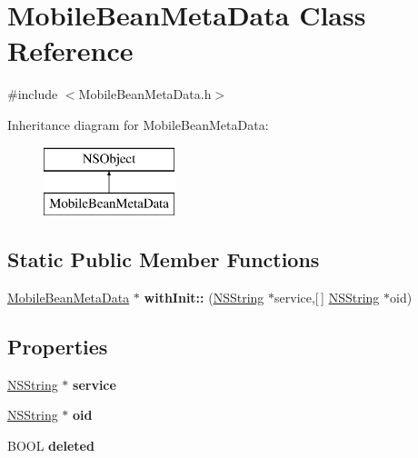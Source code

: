 \hypertarget{interface_mobile_bean_meta_data}{
\section{\-Mobile\-Bean\-Meta\-Data \-Class \-Reference}
\label{interface_mobile_bean_meta_data}
}


{\ttfamily \#include $<$\-Mobile\-Bean\-Meta\-Data.\-h$>$}

\-Inheritance diagram for \-Mobile\-Bean\-Meta\-Data\-:\begin{figure}[H]
\begin{center}
\leavevmode
\includegraphics[height=2.000000cm]{interface_mobile_bean_meta_data}
\end{center}
\end{figure}
\subsection*{\-Static \-Public \-Member \-Functions}
\begin{DoxyCompactItemize}
\item 
\hypertarget{interface_mobile_bean_meta_data_a3a62abb5f161e11bc11c7c7c0a5852d7}{
\hyperlink{interface_mobile_bean_meta_data}{\-Mobile\-Bean\-Meta\-Data} $\ast$ {\bfseries with\-Init\-::} (\hyperlink{class_n_s_string}{\-N\-S\-String} $\ast$service,\mbox{[}$\,$\mbox{]} \hyperlink{class_n_s_string}{\-N\-S\-String} $\ast$oid)}
\label{interface_mobile_bean_meta_data_a3a62abb5f161e11bc11c7c7c0a5852d7}

\end{DoxyCompactItemize}
\subsection*{\-Properties}
\begin{DoxyCompactItemize}
\item 
\hypertarget{interface_mobile_bean_meta_data_a92020136f5c9b890d273a4bffc79041f}{
\hyperlink{class_n_s_string}{\-N\-S\-String} $\ast$ {\bfseries service}}
\label{interface_mobile_bean_meta_data_a92020136f5c9b890d273a4bffc79041f}

\item 
\hypertarget{interface_mobile_bean_meta_data_aaf38f1170c640abeea172c9d97296bec}{
\hyperlink{class_n_s_string}{\-N\-S\-String} $\ast$ {\bfseries oid}}
\label{interface_mobile_bean_meta_data_aaf38f1170c640abeea172c9d97296bec}

\item 
\hypertarget{interface_mobile_bean_meta_data_ab691f741ac2f8586e8cee395fa14ec9b}{
\-B\-O\-O\-L {\bfseries deleted}}
\label{interface_mobile_bean_meta_data_ab691f741ac2f8586e8cee395fa14ec9b}

\end{DoxyCompactItemize}


